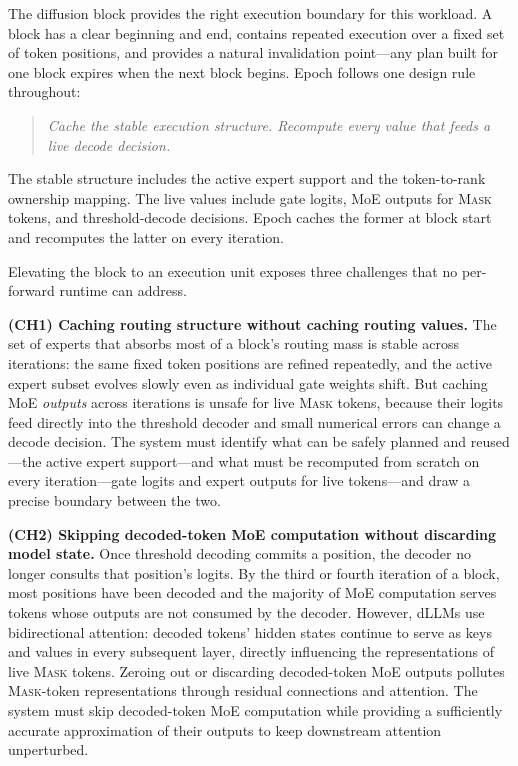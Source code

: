 \documentclass[sigconf,review,anonymous, 10pt]{acmart}
\newcommand{\sys}{Epoch}
\newcommand{\mask}{\textsc{Mask}}
\begin{document}
The diffusion block provides the right execution boundary for this workload.
A block has a clear beginning and end, contains repeated execution over a fixed set of token positions, and provides a natural invalidation point---any plan built for one block expires when the next block begins.
\sys{} follows one design rule throughout:

\begin{quote}\emph{Cache the stable execution structure.  Recompute every value that feeds a live decode decision.}\end{quote}

\noindent The stable structure includes the active expert support and the token-to-rank ownership mapping.
The live values include gate logits, MoE outputs for \mask{} tokens, and threshold-decode decisions.
\sys{} caches the former at block start and recomputes the latter on every iteration.

Elevating the block to an execution unit exposes three challenges that no per-forward runtime can address.

\textbf{(CH1) Caching routing structure without caching routing values.}
The set of experts that absorbs most of a block's routing mass is stable across iterations: the same fixed token positions are refined repeatedly, and the active expert subset evolves slowly even as individual gate weights shift.
But caching MoE \emph{outputs} across iterations is unsafe for live \mask{} tokens, because their logits feed directly into the threshold decoder and small numerical errors can change a decode decision.
The system must identify what can be safely planned and reused---the active expert support---and what must be recomputed from scratch on every iteration---gate logits and expert outputs for live tokens---and draw a precise boundary between the two.

\textbf{(CH2) Skipping decoded-token MoE computation without discarding model state.}
Once threshold decoding commits a position, the decoder no longer consults that position's logits.
By the third or fourth iteration of a block, most positions have been decoded and the majority of MoE computation serves tokens whose outputs are not consumed by the decoder.
However, dLLMs use bidirectional attention: decoded tokens' hidden states continue to serve as keys and values in every subsequent layer, directly influencing the representations of live \mask{} tokens.
Zeroing out or discarding decoded-token MoE outputs pollutes \mask{}-token representations through residual connections and attention.
The system must skip decoded-token MoE computation while providing a sufficiently accurate approximation of their outputs to keep downstream attention unperturbed.
\end{document}

